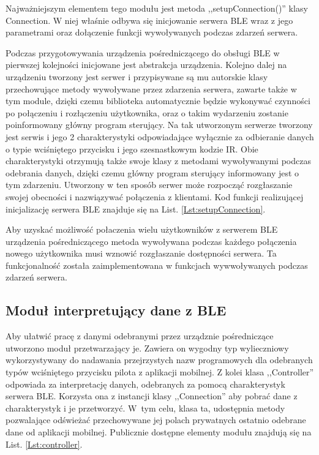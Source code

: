 \documentclass[12pt,twoside]{article}
\begin{document}


Najważniejszym elementem tego modułu jest metoda ,,setupConnection()'' klasy Connection. W niej właśnie odbywa się inicjowanie serwera BLE wraz z jego parametrami oraz dołączenie funkcji wywoływanych podczas zdarzeń serwera.

Podczas przygotowywania urządzenia pośredniczącego do obsługi BLE w pierwszej kolejności inicjowane jest abstrakcja urządzenia. Kolejno dalej na urządzeniu tworzony jest serwer i przypisywane są mu autorskie klasy przechowujące metody wywoływane przez zdarzenia serwera, zawarte także w tym module, dzięki czemu biblioteka automatycznie będzie wykonywać czynności po połączeniu i rozłączeniu użytkownika, oraz o takim wydarzeniu zostanie poinformowany główny program sterujący.
Na tak utworzonym serwerze tworzony jest serwis i jego 2 charakterystyki odpowiadające wyłącznie za odbieranie danych o typie wciśniętego przycisku i jego szesnastkowym kodzie IR. Obie charakterystyki otrzymują także swoje klasy z metodami wywoływanymi podczas odebrania danych, dzięki czemu główny program sterujący informowany jest o tym zdarzeniu. Utworzony w ten sposób serwer może rozpocząć rozgłaszanie swojej obecności i nazwiązywać połączenia z klientami. Kod funkcji realizującej inicjalizację serwera BLE znajduje się na List. \ref*{Lst:setupConnection}.



Aby uzyskać możliwość połaczenia wielu użytkowników z serwerem BLE urządzenia pośredniczącego metoda wywoływana podczas każdego połączenia nowego użytkownika musi wznowić rozgłaszanie dostępności serwera. Ta funkcjonalność została zaimplementowana w funkcjach wywwoływanych podczas zdarzeń serwera.
\subsection{Moduł interpretujący dane z BLE}
Aby ułatwić pracę z danymi odebranymi przez urządznie pośredniczące utworzono moduł przetwarzający je. Zawiera on wygodny typ wylieczniowy wykorzystywany do nadawania przejrzystych nazw programowych dla odebranych typów wciśniętego przycisku pilota z aplikacji mobilnej.
Z kolei klasa ,,Controller'' odpowiada za interpretację danych, odebranych za pomocą charakterystyk serwera BLE. Korzysta ona z instancji klasy ,,Connection'' aby pobrać dane z charakterystyk i je przetworzyć. W~tym celu, klasa ta, udostępnia metody pozwalające odświeżać przechowywane jej polach prywatnych ostatnio odebrane dane od aplikacji mobilnej. Publicznie dostępne elementy modułu znajdują się na List. \ref*{Lst:controller}.
\end{document}
